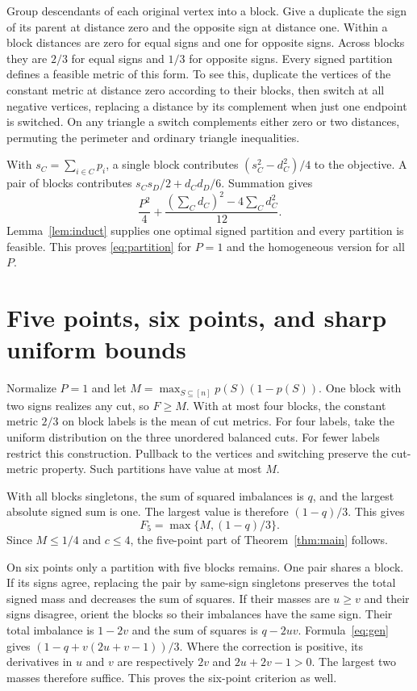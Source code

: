 \documentclass[11pt]{article}
\begin{document}
Group descendants of each original vertex into a block. Give a duplicate the sign of its parent at distance zero and the opposite sign at distance one. Within a block distances are zero for equal signs and one for opposite signs. Across blocks they are $2/3$ for equal signs and $1/3$ for opposite signs. Every signed partition defines a feasible metric of this form. To see this, duplicate the vertices of the constant metric at distance zero according to their blocks, then switch at all negative vertices, replacing a distance by its complement when just one endpoint is switched. On any triangle a switch complements either zero or two distances, permuting the perimeter and ordinary triangle inequalities.

With $s_C=\sum_{i\in C}p_i$, a single block contributes $(s_C^2-d_C^2)/4$ to the objective. A pair of blocks contributes $s_Cs_D/2+d_Cd_D/6$. Summation gives
\begin{equation}\label{eq:gen}
 \frac{P^2}{4}+\frac{(\sum_C d_C)^2-4\sum_C d_C^2}{12}.
\end{equation}
Lemma~\ref{lem:induct} supplies one optimal signed partition and every partition is feasible. This proves \eqref{eq:partition} for $P=1$ and the homogeneous version for all $P$.

\section{Five points, six points, and sharp uniform bounds}
Normalize $P=1$ and let $M=\max_{S\subseteq[n]}p(S)(1-p(S))$. One block with two signs realizes any cut, so $F\ge M$. With at most four blocks, the constant metric $2/3$ on block labels is the mean of cut metrics. For four labels, take the uniform distribution on the three unordered balanced cuts. For fewer labels restrict this construction. Pullback to the vertices and switching preserve the cut-metric property. Such partitions have value at most $M$.

With all blocks singletons, the sum of squared imbalances is $q$, and the largest absolute signed sum is one. The largest value is therefore $(1-q)/3$. This gives
\[
 F_5=\max\{M,(1-q)/3\}.
\]
Since $M\le1/4$ and $c\le4$, the five-point part of Theorem~\ref{thm:main} follows.

On six points only a partition with five blocks remains. One pair shares a block. If its signs agree, replacing the pair by same-sign singletons preserves the total signed mass and decreases the sum of squares. If their masses are $u\ge v$ and their signs disagree, orient the blocks so their imbalances have the same sign. Their total imbalance is $1-2v$ and the sum of squares is $q-2uv$. Formula~\eqref{eq:gen} gives $(1-q+v(2u+v-1))/3$. Where the correction is positive, its derivatives in $u$ and $v$ are respectively $2v$ and $2u+2v-1>0$. The largest two masses therefore suffice. This proves the six-point criterion as well.
\end{document}
